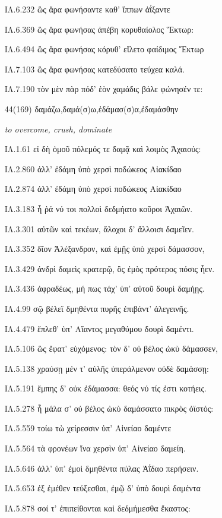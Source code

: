 \begin{enumerate}
{ΙΛ.6.232 ὣς ἄρα φωνήσαντε καθ' ἵππων ἀΐξαντε

ΙΛ.6.369 ὣς ἄρα φωνήσας ἀπέβη κορυθαίολος Ἕκτωρ:

ΙΛ.6.494 ὣς ἄρα φωνήσας κόρυθ' εἵλετο φαίδιμος Ἕκτωρ

ΙΛ.7.103 ὣς ἄρα φωνήσας κατεδύσατο τεύχεα καλά.

ΙΛ.7.190 τὸν μὲν πὰρ πόδ' ἑὸν χαμάδις βάλε φώνησέν τε:
}

\clearpage
\item[\large 44(169)]{\large \g δαμάζω,δαμά(σ)ω,ἐδάμασ(σ)α,ἐδαμάσθην}

\hspace{0.2cm} \textit{ to overcome, crush, dominate  }

{\g
ΙΛ.1.61 εἰ δὴ ὁμοῦ πόλεμός τε δαμᾷ καὶ λοιμὸς Ἀχαιούς:

ΙΛ.2.860 ἀλλ' ἐδάμη ὑπὸ χερσὶ ποδώκεος Αἰακίδαο

ΙΛ.2.874 ἀλλ' ἐδάμη ὑπὸ χερσὶ ποδώκεος Αἰακίδαο

ΙΛ.3.183 ἦ ῥά νύ τοι πολλοὶ δεδμήατο κοῦροι Ἀχαιῶν.

ΙΛ.3.301 αὐτῶν καὶ τεκέων, ἄλοχοι δ' ἄλλοισι δαμεῖεν.

ΙΛ.3.352 δῖον Ἀλέξανδρον, καὶ ἐμῇς ὑπὸ χερσὶ δάμασσον,

ΙΛ.3.429 ἀνδρὶ δαμεὶς κρατερῷ, ὃς ἐμὸς πρότερος πόσις ἦεν.

ΙΛ.3.436 ἀφραδέως, μή πως τάχ' ὑπ' αὐτοῦ δουρὶ δαμήῃς.

ΙΛ.4.99 σῷ βέλεϊ δμηθέντα πυρῆς ἐπιβάντ' ἀλεγεινῆς.

ΙΛ.4.479 ἔπλεθ' ὑπ' Αἴαντος μεγαθύμου δουρὶ δαμέντι.

ΙΛ.5.106 ὣς ἔφατ' εὐχόμενος: τὸν δ' οὐ βέλος ὠκὺ δάμασσεν,

ΙΛ.5.138 χραύσῃ μέν τ' αὐλῆς ὑπεράλμενον οὐδὲ δαμάσσῃ:

ΙΛ.5.191 ἔμπης δ' οὐκ ἐδάμασσα: θεός νύ τίς ἐστι κοτήεις.

ΙΛ.5.278 ἦ μάλα σ' οὐ βέλος ὠκὺ δαμάσσατο πικρὸς ὀϊστός:

ΙΛ.5.559 τοίω τὼ χείρεσσιν ὑπ' Αἰνείαο δαμέντε

ΙΛ.5.564 τὰ φρονέων ἵνα χερσὶν ὑπ' Αἰνείαο δαμείη.

ΙΛ.5.646 ἀλλ' ὑπ' ἐμοὶ δμηθέντα πύλας Ἀΐδαο περήσειν.

ΙΛ.5.653 ἐξ ἐμέθεν τεύξεσθαι, ἐμῷ δ' ὑπὸ δουρὶ δαμέντα

ΙΛ.5.878 σοί τ' ἐπιπείθονται καὶ δεδμήμεσθα ἕκαστος:

}
\end{enumerate}
